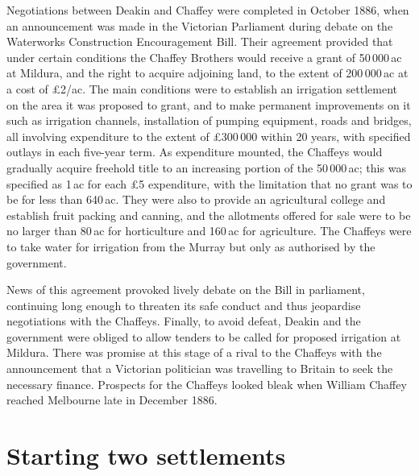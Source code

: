 Negotiations between Deakin and Chaffey were completed in October
1886, when an announcement was made in the Victorian Parliament during
debate on the Waterworks Construction Encouragement Bill.  Their
agreement provided that under certain conditions the Chaffey Brothers
would receive a grant of 50\,000\,ac at Mildura, and the right to
acquire adjoining land, to the extent of 200\,000\,ac at a cost of
\pounds2/ac.  The main conditions were to establish an irrigation
settlement on the area it was proposed to grant, and to make permanent
improvements on it such as irrigation channels, installation of
pumping equipment, roads and bridges, all involving expenditure to the
extent of \pounds300\,000 within 20 years, with specified outlays in
each five-year term.  As expenditure mounted, the Chaffeys would
gradually acquire freehold title to an increasing portion of the
50\,000\,ac; this was specified as 1\,ac for each \pounds5
expenditure, with the limitation that no grant was to be for less than
640\,ac.  They were also to provide an agricultural college and
establish fruit packing and canning, and the allotments offered for
sale were to be no larger than 80\,ac for horticulture and 160\,ac for
agriculture. The Chaffeys were to take water for irrigation from the
Murray but only as authorised by the
government.

News of this agreement provoked lively debate on the Bill in
parliament, continuing long enough to threaten its safe conduct and
thus jeopardise negotiations with the Chaffeys.  Finally, to avoid
defeat, Deakin and the government were obliged to allow tenders to be
called for proposed irrigation at Mildura.  There was promise at this
stage of a rival to the Chaffeys with the announcement that a
Victorian politician was travelling to Britain to seek the necessary
finance.  Prospects for the Chaffeys looked bleak when William Chaffey
reached Melbourne late in December 1886.

\section*{Starting two settlements}


